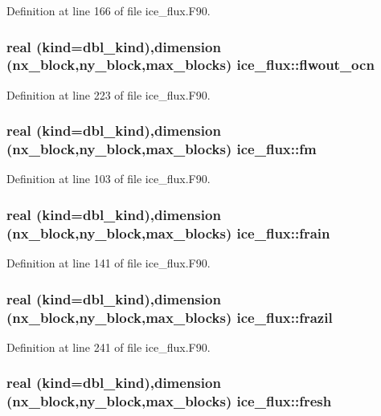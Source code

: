 Definition at line 166 of file ice\_\-flux.F90.\hypertarget{namespaceice__flux_a0242ff7a5b643169198472b59e49cfa7}{
\subsubsection[{flwout\_\-ocn}]{\setlength{\rightskip}{0pt plus 5cm}real (kind=dbl\_\-kind),dimension (nx\_\-block,ny\_\-block,max\_\-blocks) {\bf ice\_\-flux::flwout\_\-ocn}}}
\label{namespaceice__flux_a0242ff7a5b643169198472b59e49cfa7}


Definition at line 223 of file ice\_\-flux.F90.\hypertarget{namespaceice__flux_aa2cb3a98eac5adcd5441f55fe26be618}{
\subsubsection[{fm}]{\setlength{\rightskip}{0pt plus 5cm}real (kind=dbl\_\-kind),dimension (nx\_\-block,ny\_\-block,max\_\-blocks) {\bf ice\_\-flux::fm}}}
\label{namespaceice__flux_aa2cb3a98eac5adcd5441f55fe26be618}


Definition at line 103 of file ice\_\-flux.F90.\hypertarget{namespaceice__flux_a82a0812de1a89016e9cdb1b60e3cab05}{
\subsubsection[{frain}]{\setlength{\rightskip}{0pt plus 5cm}real (kind=dbl\_\-kind),dimension (nx\_\-block,ny\_\-block,max\_\-blocks) {\bf ice\_\-flux::frain}}}
\label{namespaceice__flux_a82a0812de1a89016e9cdb1b60e3cab05}


Definition at line 141 of file ice\_\-flux.F90.\hypertarget{namespaceice__flux_a5e63c63db5a472f4041fc150316b8c67}{
\subsubsection[{frazil}]{\setlength{\rightskip}{0pt plus 5cm}real (kind=dbl\_\-kind),dimension (nx\_\-block,ny\_\-block,max\_\-blocks) {\bf ice\_\-flux::frazil}}}
\label{namespaceice__flux_a5e63c63db5a472f4041fc150316b8c67}


Definition at line 241 of file ice\_\-flux.F90.\hypertarget{namespaceice__flux_adbdb875a7e468b890dba7204d972c05a}{
\subsubsection[{fresh}]{\setlength{\rightskip}{0pt plus 5cm}real (kind=dbl\_\-kind),dimension (nx\_\-block,ny\_\-block,max\_\-blocks) {\bf ice\_\-flux::fresh}}}
\label{namespaceice__flux_adbdb875a7e468b890dba7204d972c05a}


